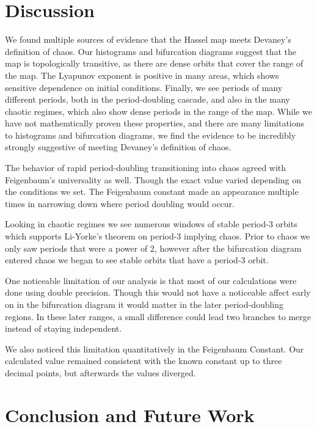 \documentclass[12pt]{article}
\begin{document}
\section{Discussion}

We found multiple sources of evidence that the Hassel map meets Devaney's definition of chaos. Our histograms and bifurcation diagrams suggest that the map is topologically transitive, as there are dense orbits that cover the range of the map. The Lyapunov exponent is positive in many areas, which shows sensitive dependence on initial conditions. Finally, we see periods of many different periods, both in the period-doubling cascade, and also in the many chaotic regimes, which also show dense periods in the range of the map. While we have not mathemtically proven these properties, and there are many limitations to histograms and bifurcation diagrams, we find the evidence to be incredibly strongly suggestive of meeting Devaney's definition of chaos.

The behavior of rapid period-doubling transitioning into chaos agreed with Feigenbaum's universality as well. Though the exact value varied depending on the conditions we set. The Feigenbaum constant made an appearance multiple times in narrowing down where period doubling would occur.

Looking in chaotic regimes we see numerous windows of stable period-3 orbits which supports Li-Yorke's theorem on period-3 implying chaos. Prior to chaos we only saw periods that were a power of 2, however after the bifurcation diagram entered chaos we began to see stable orbits that have a period-3 orbit.

One noticeable limitation of our analysis is that most of our calculations were done using double precision. Though this would not have a noticeable affect early on in the bifurcation diagram it would matter in the later period-doubling regions. In these later ranges, a small difference could lead two branches to merge instead of staying independent.

We also noticed this limitation quantitatively in the Feigenbaum Constant. Our calculated value remained consistent with the known constant up to three decimal points, but afterwards the values diverged.
\section{Conclusion and Future Work}
\end{document}
